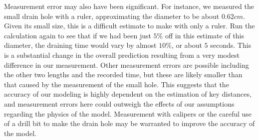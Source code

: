 \documentclass{ximera}
\begin{document}
\begin{enumerate}
    Measurement error may also have been significant.  For instance, we measured the small drain hole with a ruler, approximating the diameter to be about $0.62 cm$.  Given its small size, this is a difficult estimate to make with only a ruler.  Run the calculation again to see that if we had been just $5\%$ off in this estimate of this diameter, the draining time would vary by almost $10\%$, or about $5$ seconds.  This is a substantial change in the overall prediction resulting from a very modest difference in our measurement.  Other measurement errors are possible including the other two lengths and the recorded time, but these are likely smaller than that caused by the measurement of the small hole.  This suggests that the accuracy of our modeling is highly dependent on the estimation of key distances, and measurement errors here could outweigh the effects of our assumptions regarding the physics of the model.  Measurement with calipers or the careful use of a drill bit to make the drain hole may be warranted to improve the accuracy of the model.
\end{enumerate}
\end{document}
